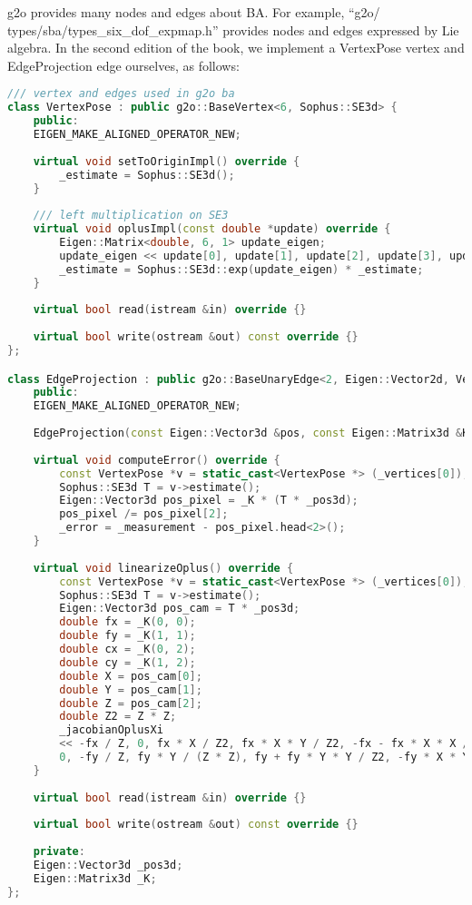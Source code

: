 g2o provides many nodes and edges about BA. For example, ``g2o/\\types/sba/types\_six\_dof\_expmap.h'' provides nodes and edges expressed by Lie algebra. In the second edition of the book, we implement a VertexPose vertex and EdgeProjection edge ourselves, as follows:
\begin{lstlisting}[language=c++,caption=slambook2/ch7/pose_estimation_3d2d.cpp (part)]
/// vertex and edges used in g2o ba
class VertexPose : public g2o::BaseVertex<6, Sophus::SE3d> {
	public:
	EIGEN_MAKE_ALIGNED_OPERATOR_NEW;
	
	virtual void setToOriginImpl() override {
		_estimate = Sophus::SE3d();
	}
	
	/// left multiplication on SE3
	virtual void oplusImpl(const double *update) override {
		Eigen::Matrix<double, 6, 1> update_eigen;
		update_eigen << update[0], update[1], update[2], update[3], update[4], update[5];
		_estimate = Sophus::SE3d::exp(update_eigen) * _estimate;
	}
	
	virtual bool read(istream &in) override {}
	
	virtual bool write(ostream &out) const override {}
};

class EdgeProjection : public g2o::BaseUnaryEdge<2, Eigen::Vector2d, VertexPose> {
	public:
	EIGEN_MAKE_ALIGNED_OPERATOR_NEW;
	
	EdgeProjection(const Eigen::Vector3d &pos, const Eigen::Matrix3d &K) : _pos3d(pos), _K(K) {}
	
	virtual void computeError() override {
		const VertexPose *v = static_cast<VertexPose *> (_vertices[0]);
		Sophus::SE3d T = v->estimate();
		Eigen::Vector3d pos_pixel = _K * (T * _pos3d);
		pos_pixel /= pos_pixel[2];
		_error = _measurement - pos_pixel.head<2>();
	}
	
	virtual void linearizeOplus() override {
		const VertexPose *v = static_cast<VertexPose *> (_vertices[0]);
		Sophus::SE3d T = v->estimate();
		Eigen::Vector3d pos_cam = T * _pos3d;
		double fx = _K(0, 0);
		double fy = _K(1, 1);
		double cx = _K(0, 2);
		double cy = _K(1, 2);
		double X = pos_cam[0];
		double Y = pos_cam[1];
		double Z = pos_cam[2];
		double Z2 = Z * Z;
		_jacobianOplusXi
		<< -fx / Z, 0, fx * X / Z2, fx * X * Y / Z2, -fx - fx * X * X / Z2, fx * Y / Z,
		0, -fy / Z, fy * Y / (Z * Z), fy + fy * Y * Y / Z2, -fy * X * Y / Z2, -fy * X / Z;
	}
	
	virtual bool read(istream &in) override {}
	
	virtual bool write(ostream &out) const override {}
	
	private:
	Eigen::Vector3d _pos3d;
	Eigen::Matrix3d _K;
};
\end{lstlisting}

